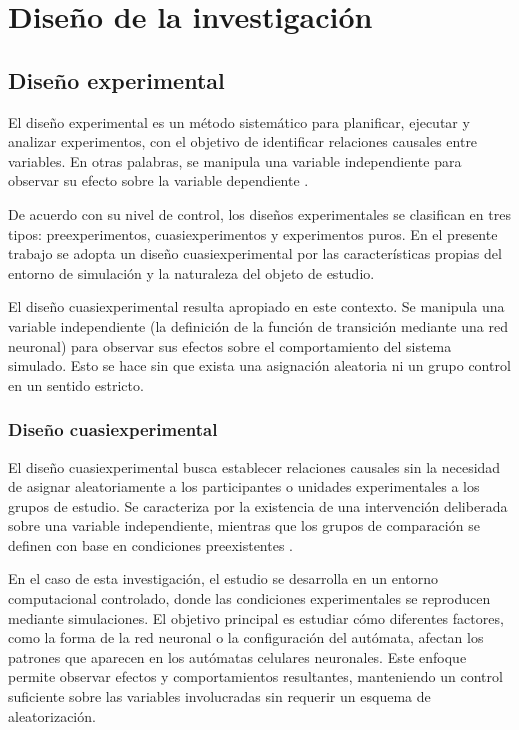 \section{Diseño de la investigación}

\subsection{Diseño experimental}

El diseño experimental es un método sistemático para planificar, ejecutar y analizar experimentos, con el objetivo de identificar relaciones causales entre variables. En otras palabras, se manipula una variable independiente para observar su efecto sobre la variable dependiente \cite{experimental}.

De acuerdo con su nivel de control, los diseños experimentales se clasifican en tres tipos: preexperimentos, cuasiexperimentos y experimentos puros. En el presente trabajo se adopta un diseño cuasiexperimental por las características propias del entorno de simulación y la naturaleza del objeto de estudio.

El diseño cuasiexperimental resulta apropiado en este contexto. Se manipula una variable independiente (la definición de la función de transición mediante una red neuronal) para observar sus efectos sobre el comportamiento del sistema simulado. Esto se hace sin que exista una asignación aleatoria ni un grupo control en un sentido estricto. 

\subsubsection{Diseño cuasiexperimental}

El diseño cuasiexperimental busca establecer relaciones causales sin la necesidad de asignar aleatoriamente a los participantes o unidades experimentales a los grupos de estudio. Se caracteriza por la existencia de una intervención deliberada sobre una variable independiente, mientras que los grupos de comparación se definen con base en condiciones preexistentes \cite{cuasiexperimento}.

En el caso de esta investigación, el estudio se desarrolla en un entorno computacional controlado, donde las condiciones experimentales se reproducen mediante simulaciones. El objetivo principal es estudiar cómo diferentes factores, como la forma de la red neuronal o la configuración del autómata, afectan los patrones que aparecen en los autómatas celulares neuronales. Este enfoque permite observar efectos y comportamientos resultantes, manteniendo un control suficiente sobre las variables involucradas sin requerir un esquema de aleatorización.